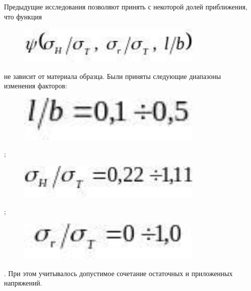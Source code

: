Предыдущие исследования позволяют принять с некоторой долей приближения,
что функция \begin{figure}[H]
	\centering
	\includegraphics[width=0.8\textwidth]{assets/1226}
	\caption*{}
\end{figure} не зависит от материала
образца. Были приняты следующие диапазоны изменения факторов:
\begin{figure}[H]
	\centering
	\includegraphics[width=0.8\textwidth]{assets/1227}
	\caption*{}
\end{figure};
\begin{figure}[H]
	\centering
	\includegraphics[width=0.8\textwidth]{assets/1228}
	\caption*{}
\end{figure};
\begin{figure}[H]
	\centering
	\includegraphics[width=0.8\textwidth]{assets/1229}
	\caption*{}
\end{figure}. При этом учитывалось допустимое
сочетание остаточных и приложенных напряжений.

